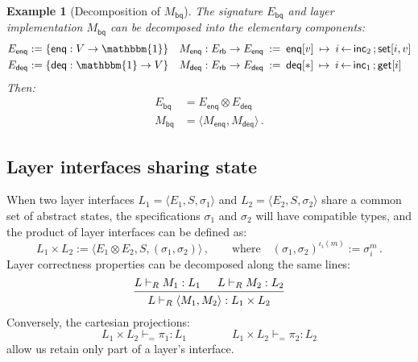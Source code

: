 \documentclass[11pt,oneside,draft]{book}
\newtheorem{example}[theorem]{Example}
\theoremstyle{definition}
\newcommand{\kw}[1]{\ensuremath{ \mathsf{#1} }}
\begin{document}
\begin{example}[Decomposition of $M_\kw{bq}$]
The signature $E_\kw{bq}$ and layer implementation $M_\kw{bq}$
can be decomposed into the elementary components:
\begin{align*}
  E_\kw{enq} &:= \{ \kw{enq} : V \rightarrow \mathbbm{1} \} &
  M_\kw{enq} : E_\kw{rb} \rightarrow E_\kw{enq} \: &:= \:
    \kw{enq}[v] \: \mapsto \:
      i \mathop{\leftarrow} \kw{inc}_2 \mathop{;}
      \kw{set}[i, v] \\
  E_\kw{deq} &:= \{ \kw{deq} : \mathbbm{1} \rightarrow V \} &
  M_\kw{deq} : E_\kw{rb} \rightarrow E_\kw{deq} \: &:= \:
    \kw{deq}[*] \:\mapsto\:
      i \mathop{\leftarrow} \kw{inc}_1 \mathop{;}
      \kw{get}[i]
\end{align*}
Then:
\begin{align*}
  E_\kw{bq} &= E_\kw{enq} \otimes E_\kw{deq} \\
  M_\kw{bq} &= \langle M_\kw{enq}, M_\kw{deq} \rangle \,.
\end{align*}
\end{example}


\subsection{Layer interfaces sharing state} \label{sec:layerprod} %

When two layer interfaces
$L_1 = \langle E_1, S, \sigma_1 \rangle$ and
$L_2 = \langle E_2, S, \sigma_2 \rangle$
share a common set of abstract states,
the specifications $\sigma_1$ and $\sigma_2$
will have compatible types,
and the product of layer interfaces can be defined as:
\[
  L_1 \times L_2 :=
    \langle E_1 \otimes E_2, S, (\sigma_1, \sigma_2) \rangle \,,
  \qquad
  \text{where}
  \quad
  (\sigma_1, \sigma_2)^{\iota_i(m)} := \sigma_i^m \,.
\]
Layer correctness properties can be
decomposed along the same lines:
\[
  \begin{prooftree}
    \hypo{L \vdash_R M_1 : L_1}
    \hypo{L \vdash_R M_2 : L_2}
    \infer2{L \vdash_R \langle M_1, M_2 \rangle : L_1 \times L_2}
  \end{prooftree}
\]
Conversely, the cartesian projections:
\[
   L_1 \times L_2 \vdash_{=} \pi_1 : L_1 \qquad \qquad
   L_1 \times L_2 \vdash_{=} \pi_2 : L_2
\]
allow us retain only part of a layer's interface.
\end{document}
